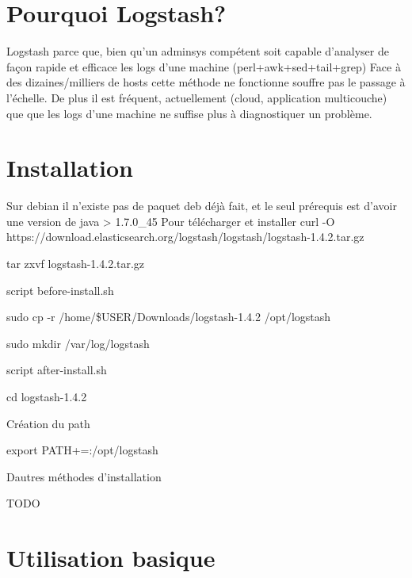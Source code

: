 \section{Pourquoi Logstash?}
Logstash parce que, bien qu'un adminsys compétent soit capable d'analyser
de façon rapide et efficace les logs d'une machine (perl+awk+sed+tail+grep)
Face à des dizaines/milliers de hosts cette méthode ne fonctionne souffre pas
le passage à l'échelle.
De plus il est fréquent, actuellement (cloud, application multicouche) que
que les logs d'une machine ne suffise plus à diagnostiquer un problème.

\section{Installation}
Sur debian il n'existe pas de paquet deb déjà fait, et le seul prérequis 
est d'avoir une version de java > 1.7.0\_45
Pour télécharger et installer
curl -O https://download.elasticsearch.org/logstash/logstash/logstash-1.4.2.tar.gz

tar zxvf logstash-1.4.2.tar.gz

script before-install.sh

sudo cp -r /home/\$USER/Downloads/logstash-1.4.2 /opt/logstash

sudo mkdir /var/log/logstash

script after-install.sh

cd logstash-1.4.2


Création du path

export PATH+=:/opt/logstash



Dautres méthodes d'installation

TODO




\section{Utilisation basique}

